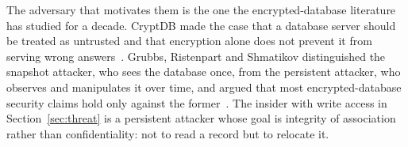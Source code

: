 The adversary that motivates them is the one the encrypted-database literature has studied for a decade. CryptDB made the case that a database server should be treated as untrusted and that encryption alone does not prevent it from serving wrong answers~\cite{popa2011cryptdb}. Grubbs, Ristenpart and Shmatikov distinguished the snapshot attacker, who sees the database once, from the persistent attacker, who observes and manipulates it over time, and argued that most encrypted-database security claims hold only against the former~\cite{grubbs2017encrypted-db}. The insider with write access in Section~\ref{sec:threat} is a persistent attacker whose goal is integrity of association rather than confidentiality: not to read a record but to relocate it.


